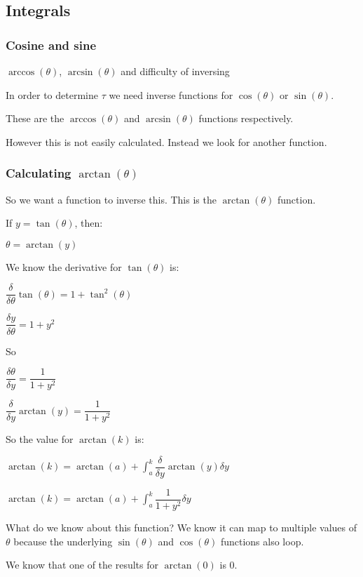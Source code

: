 
\subsection{Integrals}

\subsubsection{Cosine and sine}

\(\arccos (\theta)\), \(\arcsin (\theta )\) and difficulty of inversing

In order to determine \(\tau \) we need inverse functions for \(\cos (\theta )\) or \(\sin (\theta )\).

These are the \(\arccos (\theta )\) and \(\arcsin (\theta )\) functions respectively.

However this is not easily calculated. Instead we look for another function.

\subsubsection{Calculating \(\arctan (\theta )\)}

So we want a function to inverse this. This is the \(\arctan (\theta )\) function.

If \(y=\tan (\theta )\), then:

\(\theta =\arctan (y)\)

We know the derivative for \(\tan (\theta )\) is:

\(\dfrac{\delta }{\delta \theta }\tan (\theta )=1+\tan^2(\theta )\)

\(\dfrac{\delta y}{\delta \theta }=1+y^2\)

So

\(\dfrac{\delta \theta }{\delta y}=\dfrac{1}{1+y^2}\)

\(\dfrac{\delta }{\delta y}\arctan (y)=\dfrac{1}{1+y^2}\)

So the value for \(\arctan (k)\) is:

\(\arctan (k)=\arctan (a)+\int_a^k\dfrac{\delta }{\delta y}\arctan (y) \delta y\)

\(\arctan (k)=\arctan (a)+\int_a^k\dfrac{1}{1+y^2} \delta y\)

What do we know about this function? We know it can map to multiple values of \(\theta \) because the underlying \(\sin (\theta )\) and \(\cos (\theta )\) functions also loop.

We know that one of the results for \(\arctan (0)\) is \(0\).

